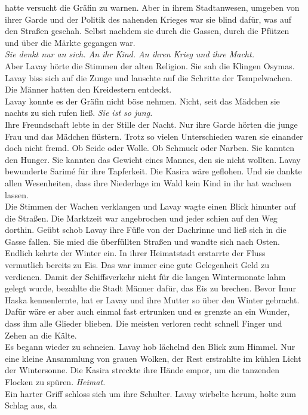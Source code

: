 hatte versucht die Gräfin zu warnen. Aber in ihrem Stadtanwesen, umgeben von ihrer Garde und der 
Politik des nahenden Krieges war sie blind dafür, was auf den Straßen geschah. Selbst nachdem sie 
durch die Gassen, durch die Pfützen und über die Märkte gegangen war.\\
\textit{Sie denkt nur an sich. An ihr Kind. An ihren Krieg und ihre Macht.}\\
Aber Lavay hörte die Stimmen der alten Religion. Sie sah die Klingen Osymas. Lavay biss sich auf die Zunge 
und lauschte auf die Schritte der Tempelwachen. Die Männer hatten den Kreidestern entdeckt.\\
Lavay konnte es der Gräfin nicht böse nehmen. Nicht, seit das Mädchen sie nachts zu sich rufen 
ließ. \textit{Sie ist so jung.}\\
Ihre Freundschaft lebte in der Stille der Nacht. Nur ihre Garde hörten die junge Frau und das 
Mädchen flüstern. Trotz so vielen Unterschieden waren sie einander doch nicht fremd. Ob Seide 
oder Wolle. Ob Schmuck oder Narben. Sie kannten den Hunger. Sie kannten das Gewicht eines Mannes, 
den sie nicht wollten. Lavay bewunderte Sarimé für ihre Tapferkeit. Die Kasira wäre geflohen. Und 
sie dankte allen Wesenheiten, dass ihre Niederlage im Wald kein Kind in ihr hat wachsen lassen.\\
Die Stimmen der Wachen verklangen und Lavay wagte einen Blick hinunter auf die Straßen. Die 
Marktzeit war angebrochen und jeder schien auf den Weg dorthin. Geübt schob Lavay ihre Füße von der 
Dachrinne und ließ sich in die Gasse fallen. Sie mied die überfüllten Straßen und wandte 
sich nach Osten. Endlich kehrte der Winter ein. In ihrer Heimatstadt erstarrte der Fluss 
vermutlich bereits zu Eis. Das war immer eine gute Gelegenheit Geld zu verdienen. Damit der 
Schiffsverkehr nicht für die langen Wintermonate lahm gelegt wurde, bezahlte die Stadt Männer dafür, 
das Eis zu brechen. Bevor Imur Haska kennenlernte, hat er Lavay und ihre Mutter so über den 
Winter gebracht. Dafür wäre er aber auch einmal fast ertrunken und es grenzte an ein Wunder, dass 
ihm alle Glieder blieben. Die meisten verloren recht schnell Finger und Zehen an die Kälte.\\
Es begann wieder zu schneien. Lavay hob lächelnd den Blick zum Himmel. Nur eine kleine Ansammlung 
von grauen Wolken, der Rest erstrahlte im kühlen Licht der Wintersonne. Die Kasira streckte ihre 
Hände empor, um die tanzenden Flocken zu spüren. \textit{Heimat.}\\
Ein harter Griff schloss sich um ihre Schulter. Lavay wirbelte herum, holte zum Schlag aus, da 
